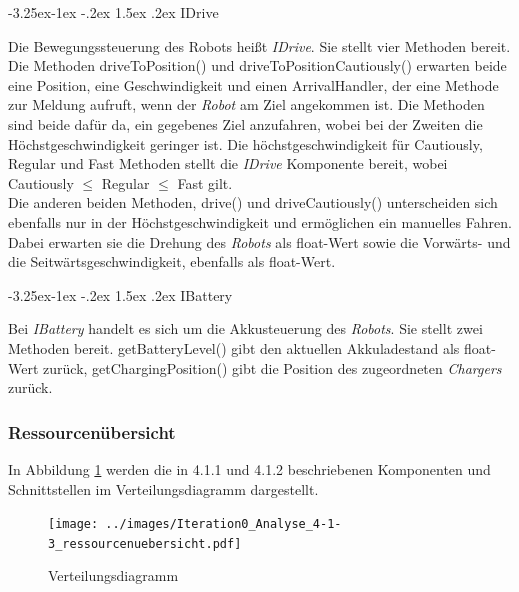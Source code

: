 \documentclass[includeheaders]{scrartcl}
\makeatletter
\renewcommand\subparagraph{\@startsection{subparagraph}{5}{\z@}%
	{-3.25ex\@plus -1ex \@minus -.2ex}%
	{1.5ex \@plus .2ex}%
	{\raggedsection\normalfont\sectfont\size@subparagraph\mdseries}%
}
\makeatother
\begin{document}
			\subparagraph{IDrive}\label{idrive}

			Die Bewegungssteuerung des Robots heißt \emph{IDrive}. Sie stellt vier
			Methoden bereit. Die Methoden driveToPosition() und
			driveToPositionCautiously() erwarten beide eine Position, eine
			Geschwindigkeit und einen ArrivalHandler, der eine Methode zur Meldung
			aufruft, wenn der \emph{Robot} am Ziel angekommen ist. Die Methoden sind
			beide dafür da, ein gegebenes Ziel anzufahren, wobei bei der Zweiten die
			Höchstgeschwindigkeit geringer ist. Die höchstgeschwindigkeit für
			Cautiously, Regular und Fast Methoden stellt die \emph{IDrive}
			Komponente bereit, wobei Cautiously $\leq$ Regular $\leq$ Fast gilt.\\
			Die anderen beiden Methoden, drive() und driveCautiously() unterscheiden
			sich ebenfalls nur in der Höchstgeschwindigkeit und ermöglichen ein
			manuelles Fahren. Dabei erwarten sie die Drehung des \emph{Robots} als
			float-Wert sowie die Vorwärts- und die Seitwärtsgeschwindigkeit,
			ebenfalls als float-Wert.

			\subparagraph{IBattery}\label{ibattery}

			Bei \emph{IBattery} handelt es sich um die Akkusteuerung des
			\emph{Robots}. Sie stellt zwei Methoden bereit. getBatteryLevel() gibt
			den aktuellen Akkuladestand als float-Wert zurück, getChargingPosition()
			gibt die Position des zugeordneten \emph{Chargers} zurück.

			\subsubsection{Ressourcenübersicht}
			In Abbildung \ref{fig:4-1-3-verteilungsdiagramm} werden die in 4.1.1 und 4.1.2 beschriebenen
			Komponenten und Schnittstellen im Verteilungsdiagramm dargestellt.

			\begin{figure}[H]
				\centering
				\texttt{[image: ../images/Iteration0\_Analyse\_4-1-3\_ressourcenuebersicht.pdf]}
				\caption{Verteilungsdiagramm}
				\label{fig:4-1-3-verteilungsdiagramm}
			\end{figure}
\end{document}
